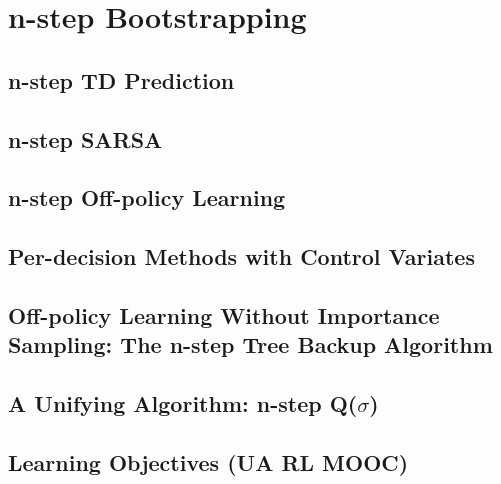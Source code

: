 \documentclass[sutton_barto_notes.tex]{subfiles}
\begin{document}
\newpage
\section{n-step Bootstrapping}

\subsection{n-step TD Prediction}
\subsection{n-step SARSA}
\subsection{n-step Off-policy Learning}
\subsection{Per-decision Methods with Control Variates}
\subsection{Off-policy Learning Without Importance Sampling: The n-step Tree Backup Algorithm}
\subsection{A Unifying Algorithm: n-step Q($\sigma$)}
\subsection{Learning Objectives (UA RL MOOC)}
\end{document}
